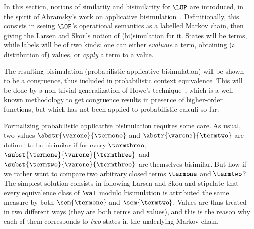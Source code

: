 

In this section, notions of similarity and bisimilarity for $\LOP$ are introduced, in
the spirit of Abramsky's work on applicative bisimulation~\cite{Abramsky-90}. Definitionally, this
consists in seeing $\LOP$'s operational semantics as a labelled Markov chain, then giving
the Larsen and Skou's notion of (bi)simulation for it. States will be terms, while labels
will be of two kinds: one can either \emph{evaluate} a term, obtaining (a distribution of) values, 
or \emph{apply} a term to a value.

The resulting bisimulation (probabilistic applicative bisimulation) 
will be shown to be a congruence, thus included in probabilistic context equivalence.
This will be done by a non-trivial generalization of Howe's technique~\cite{Howe-96}, which is
a well-known methodology to get congruence results in presence of higher-order functions, but
which has not been applied to probabilistic calculi so far. 

Formalizing probabilistic applicative bisimulation requires some care.
As usual, two values $\abstr{\varone}{\termone}$ and $\abstr{\varone}{\termtwo}$ are defined
to be bisimilar if for every $\termthree$, $\subst{\termone}{\varone}{\termthree}$
and $\subst{\termtwo}{\varone}{\termthree}$ are themselves bisimilar. But how if
we rather want to compare two arbitrary closed terms $\termone$ and $\termtwo$?
The simplest solution consists in following Larsen and Skou and stipulate that
every equivalence class of $\val$ modulo bisimulation is attributed the same
measure by both $\sem{\termone}$ and $\sem{\termtwo}$. Values
are thus treated in two different ways (they are both terms and values), and this is the reason why each of
them corresponds to \emph{two} states in the underlying Markov chain.


